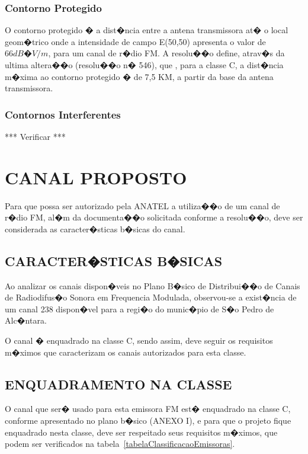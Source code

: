 \subsection{Contorno Protegido}

O contorno protegido � a dist�ncia entre a antena transmissora at� o local geom�trico onde a intensidade de campo E(50,50) apresenta o valor de 
$66 dB�V /m$, para um canal de r�dio FM. A resolu��o define, atrav�s da ultima altera��o (resolu��o n� 546), que , para a classe C, a dist�ncia m�xima ao
contorno protegido � de 7,5 KM, a partir da base da antena transmissora. 

\subsection{Contornos Interferentes}

*** Verificar ***

\chapter{CANAL PROPOSTO}

Para que possa ser autorizado pela ANATEL a utiliza��o de um canal de r�dio FM, al�m da documenta��o solicitada conforme a resolu��o, deve ser considerada
 as caracter�sticas b�sicas do canal.%

\section{CARACTER�STICAS B�SICAS}

Ao analizar os canais dispon�veis no Plano B�sico de Distribui��o de Canais de Radiodifus�o Sonora em Frequencia Modulada, observou-se a exist�ncia de um 
canal 238
dispon�vel para a regi�o do munic�pio de S�o Pedro de Alc�ntara.

O canal � enquadrado na classe C, sendo assim, deve seguir os requisitos m�ximos que caracterizam os canais autorizados para esta classe.

\section{ENQUADRAMENTO NA CLASSE}

O canal que ser� usado para esta emissora FM est� enquadrado na classe C, conforme apresentado no plano b�sico 
(ANEXO I), e para que o projeto fique enquadrado nesta classe, deve ser respeitado seus requisitos m�ximos, que podem ser verificados na 
tabela~\ref{tabelaClassificacaoEmissoras}.

